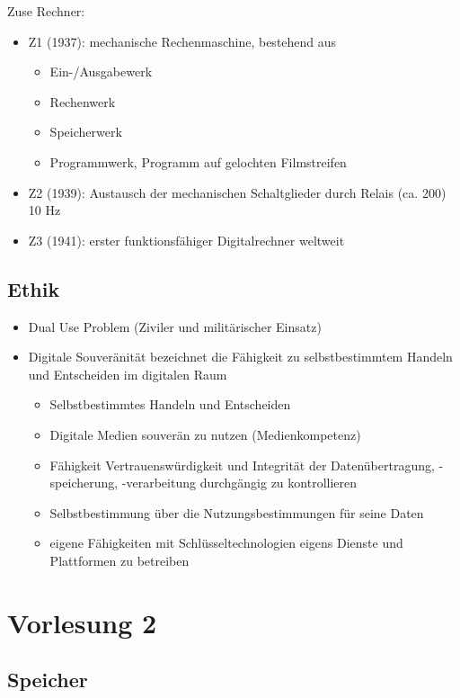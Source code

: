 \documentclass[a4paper,12pt,leqno]{article}
\begin{document}
Zuse Rechner:
\begin{itemize}
\item Z1 (1937): mechanische Rechenmaschine, bestehend aus
	\begin{itemize}
	\item Ein-/Ausgabewerk
	\item Rechenwerk
	\item Speicherwerk
	\item Programmwerk, Programm auf gelochten Filmstreifen
	\end{itemize}
\item Z2 (1939): Austausch der mechanischen Schaltglieder durch Relais (ca. 200) 10 Hz
\item Z3 (1941): erster funktionsfähiger Digitalrechner weltweit
\end{itemize}

\subsection{Ethik}
\begin{itemize}
\item Dual Use Problem (Ziviler und militärischer Einsatz)
\item Digitale Souveränität bezeichnet die Fähigkeit zu selbstbestimmtem Handeln und Entscheiden im digitalen Raum
	\begin{itemize}
	\item Selbstbestimmtes Handeln und Entscheiden
	\item Digitale Medien souverän zu nutzen (Medienkompetenz)
	\item Fähigkeit Vertrauenswürdigkeit und Integrität der Datenübertragung, -speicherung, -verarbeitung durchgängig zu kontrollieren
	\item Selbstbestimmung über die Nutzungsbestimmungen für seine Daten
	\item eigene Fähigkeiten mit Schlüsseltechnologien eigens Dienste und Plattformen zu betreiben
	\end{itemize}
\end{itemize}

\section{Vorlesung 2}
\subsection{Speicher}
\end{document}
